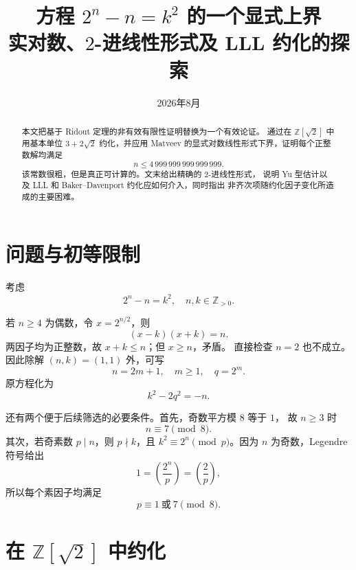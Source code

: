 \documentclass[11pt,a4paper]{ctexart}
\title{方程 \(2^n-n=k^2\) 的一个显式上界\\
  \large 实对数、\(2\)-进线性形式及 LLL 约化的探索}
\author{}
\date{2026年8月}
\theoremstyle{remark}
\newcommand{\Z}{\mathbb Z}
\begin{document}
\maketitle

\begin{abstract}
本文把基于 Ridout 定理的非有效有限性证明替换为一个有效论证。
通过在 \(\Z[\sqrt2]\) 中用基本单位 \(3+2\sqrt2\) 约化，并应用
Matveev 的显式对数线性形式下界，证明每个正整数解均满足
\[
 n\le 4\,999\,999\,999\,999\,999.
\]
该常数很粗，但是真正可计算的。文末给出精确的 \(2\)-进线性形式，
说明 Yu 型估计以及 LLL 和 Baker--Davenport 约化应如何介入，同时指出
非齐次项随约化因子变化所造成的主要困难。
\end{abstract}

\section{问题与初等限制}

考虑
\begin{equation}\label{eq:main}
 2^n-n=k^2,\quad n,k\in\Z_{>0}.
\end{equation}

若 \(n\ge4\) 为偶数，令 \(x=2^{n/2}\)，则
\[
 (x-k)(x+k)=n.
\]
两因子均为正整数，故 \(x+k\le n\)；但 \(x\ge n\)，矛盾。
直接检查 \(n=2\) 也不成立。因此除解 \((n,k)=(1,1)\) 外，可写
\begin{equation}\label{eq:mq}
 n=2m+1,\quad m\ge1,\quad q=2^m.
\end{equation}
原方程化为
\begin{equation}\label{eq:norm}
 k^2-2q^2=-n.
\end{equation}

还有两个便于后续筛选的必要条件。首先，奇数平方模 \(8\) 等于 \(1\)，
故 \(n\ge3\) 时
\begin{equation}\label{eq:mod8}
 n\equiv7\pmod 8.
\end{equation}
其次，若奇素数 \(p\mid n\)，则 \(p\nmid k\)，且
\(k^2\equiv2^n\pmod p\)。因为 \(n\) 为奇数，Legendre 符号给出
\[
 1=\left(\frac{2^n}{p}\right)=\left(\frac2p\right),
\]
所以每个素因子均满足
\begin{equation}\label{eq:primefilter}
 p\equiv1\ \text{或}\ 7\pmod8.
\end{equation}

\section{在 \texorpdfstring{\(\Z[\sqrt2]\)}{Z[sqrt(2)]} 中约化}
\end{document}
